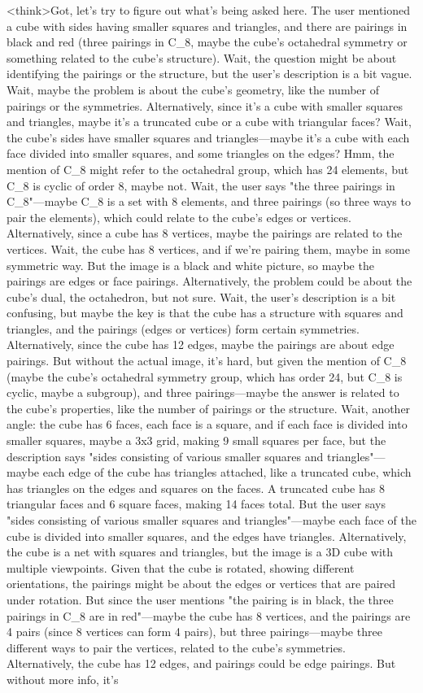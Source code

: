 <think>Got, let's try to figure out what's being asked here. The user mentioned a cube with sides having smaller squares and triangles, and there are pairings in black and red (three pairings in C_8, maybe the cube's octahedral symmetry or something related to the cube's structure). Wait, the question might be about identifying the pairings or the structure, but the user's description is a bit vague. Wait, maybe the problem is about the cube's geometry, like the number of pairings or the symmetries. Alternatively, since it's a cube with smaller squares and triangles, maybe it's a truncated cube or a cube with triangular faces? Wait, the cube's sides have smaller squares and triangles—maybe it's a cube with each face divided into smaller squares, and some triangles on the edges? Hmm, the mention of C_8 might refer to the octahedral group, which has 24 elements, but C_8 is cyclic of order 8, maybe not. Wait, the user says "the three pairings in C_8"—maybe C_8 is a set with 8 elements, and three pairings (so three ways to pair the elements), which could relate to the cube's edges or vertices. Alternatively, since a cube has 8 vertices, maybe the pairings are related to the vertices. Wait, the cube has 8 vertices, and if we're pairing them, maybe in some symmetric way. But the image is a black and white picture, so maybe the pairings are edges or face pairings. Alternatively, the problem could be about the cube's dual, the octahedron, but not sure. Wait, the user's description is a bit confusing, but maybe the key is that the cube has a structure with squares and triangles, and the pairings (edges or vertices) form certain symmetries. Alternatively, since the cube has 12 edges, maybe the pairings are about edge pairings. But without the actual image, it's hard, but given the mention of C_8 (maybe the cube's octahedral symmetry group, which has order 24, but C_8 is cyclic, maybe a subgroup), and three pairings—maybe the answer is related to the cube's properties, like the number of pairings or the structure. Wait, another angle: the cube has 6 faces, each face is a square, and if each face is divided into smaller squares, maybe a 3x3 grid, making 9 small squares per face, but the description says "sides consisting of various smaller squares and triangles"—maybe each edge of the cube has triangles attached, like a truncated cube, which has triangles on the edges and squares on the faces. A truncated cube has 8 triangular faces and 6 square faces, making 14 faces total. But the user says "sides consisting of various smaller squares and triangles"—maybe each face of the cube is divided into smaller squares, and the edges have triangles. Alternatively, the cube is a net with squares and triangles, but the image is a 3D cube with multiple viewpoints. Given that the cube is rotated, showing different orientations, the pairings might be about the edges or vertices that are paired under rotation. But since the user mentions "the pairing is in black, the three pairings in C_8 are in red"—maybe the cube has 8 vertices, and the pairings are 4 pairs (since 8 vertices can form 4 pairs), but three pairings—maybe three different ways to pair the vertices, related to the cube's symmetries. Alternatively, the cube has 12 edges, and pairings could be edge pairings. But without more info, it's 